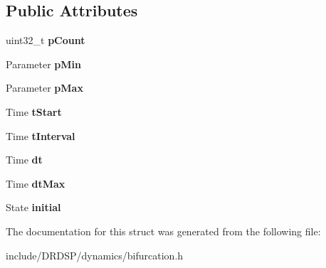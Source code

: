 \subsection*{Public Attributes}
\begin{DoxyCompactItemize}
\item 
\hypertarget{struct_d_r_d_s_p_1_1_bifurcation_diagram_generator_a401fe6f4508816a40def7c16668ab61f}{uint32\-\_\-t {\bfseries p\-Count}}\label{struct_d_r_d_s_p_1_1_bifurcation_diagram_generator_a401fe6f4508816a40def7c16668ab61f}

\item 
\hypertarget{struct_d_r_d_s_p_1_1_bifurcation_diagram_generator_a3b240212ebb475c33e35d570a56d4108}{Parameter {\bfseries p\-Min}}\label{struct_d_r_d_s_p_1_1_bifurcation_diagram_generator_a3b240212ebb475c33e35d570a56d4108}

\item 
\hypertarget{struct_d_r_d_s_p_1_1_bifurcation_diagram_generator_a344300e954653007be780298e0d4d6f1}{Parameter {\bfseries p\-Max}}\label{struct_d_r_d_s_p_1_1_bifurcation_diagram_generator_a344300e954653007be780298e0d4d6f1}

\item 
\hypertarget{struct_d_r_d_s_p_1_1_bifurcation_diagram_generator_a55ee554a077eab18424db01367d25421}{Time {\bfseries t\-Start}}\label{struct_d_r_d_s_p_1_1_bifurcation_diagram_generator_a55ee554a077eab18424db01367d25421}

\item 
\hypertarget{struct_d_r_d_s_p_1_1_bifurcation_diagram_generator_abbf77da3219b271ac4da212be8e7b08d}{Time {\bfseries t\-Interval}}\label{struct_d_r_d_s_p_1_1_bifurcation_diagram_generator_abbf77da3219b271ac4da212be8e7b08d}

\item 
\hypertarget{struct_d_r_d_s_p_1_1_bifurcation_diagram_generator_ac5bf21c14d4a6cd0b8e232fe62dddf84}{Time {\bfseries dt}}\label{struct_d_r_d_s_p_1_1_bifurcation_diagram_generator_ac5bf21c14d4a6cd0b8e232fe62dddf84}

\item 
\hypertarget{struct_d_r_d_s_p_1_1_bifurcation_diagram_generator_a212888365afe935ae64866efcadc592a}{Time {\bfseries dt\-Max}}\label{struct_d_r_d_s_p_1_1_bifurcation_diagram_generator_a212888365afe935ae64866efcadc592a}

\item 
\hypertarget{struct_d_r_d_s_p_1_1_bifurcation_diagram_generator_ad2ca029ab339876a57d4fb297440fa00}{State {\bfseries initial}}\label{struct_d_r_d_s_p_1_1_bifurcation_diagram_generator_ad2ca029ab339876a57d4fb297440fa00}

\end{DoxyCompactItemize}


The documentation for this struct was generated from the following file\-:\begin{DoxyCompactItemize}
\item 
include/\-D\-R\-D\-S\-P/dynamics/bifurcation.\-h\end{DoxyCompactItemize}
